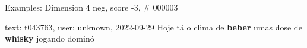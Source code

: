 \begin{frame}{Examples: Dimension 4 neg, score -3, \# 000003}
\footnotesize
\begin{alertblock}{text: t043763, user: unknown, 2022-09-29}
Hoje tá o clima de \textbf{beber} umas dose de \textbf{whisky} jogando dominó 
\textbf{}  
\end{alertblock}
\end{frame}

